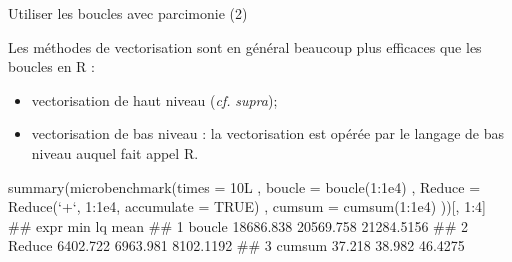 \documentclass[12pt,handout,ignorenonframetext,]{beamer}
\newenvironment{Shaded}{}{}
\newcommand{\KeywordTok}[1]{\textcolor[rgb]{0.00,0.00,1.00}{#1}}
\newcommand{\DataTypeTok}[1]{#1}
\newcommand{\DecValTok}[1]{#1}
\newcommand{\FloatTok}[1]{#1}
\newcommand{\StringTok}[1]{\textcolor[rgb]{0.00,0.50,0.50}{#1}}
\newcommand{\OtherTok}[1]{\textcolor[rgb]{1.00,0.25,0.00}{#1}}
\newcommand{\OperatorTok}[1]{#1}
\newcommand{\NormalTok}[1]{#1}
\providecommand{\tightlist}{%
  \setlength{\itemsep}{0pt}\setlength{\parskip}{0pt}}
\renewenvironment{Shaded}{\begin{snugshade}}{\end{snugshade}}
\begin{document}
\begin{frame}[fragile]{Utiliser les boucles avec parcimonie (2)}

\small
Les méthodes de vectorisation sont en général beaucoup plus efficaces
que les boucles en R :

\begin{itemize}
\tightlist
\item
  vectorisation de haut niveau (\emph{cf.} \emph{supra});
\item
  vectorisation de bas niveau : la vectorisation est opérée par le
  langage de bas niveau auquel fait appel R.
\end{itemize}

\pause \footnotesize

\begin{Shaded}
\begin{Highlighting}[]
\KeywordTok{summary}\NormalTok{(}\KeywordTok{microbenchmark}\NormalTok{(}\DataTypeTok{times =}\NormalTok{ 10L}
\NormalTok{  , }\DataTypeTok{boucle =} \KeywordTok{boucle}\NormalTok{(}\DecValTok{1}\OperatorTok{:}\FloatTok{1e4}\NormalTok{)}
\NormalTok{  , }\DataTypeTok{Reduce =} \KeywordTok{Reduce}\NormalTok{(}\StringTok{`}\DataTypeTok{+}\StringTok{`}\NormalTok{, }\DecValTok{1}\OperatorTok{:}\FloatTok{1e4}\NormalTok{, }\DataTypeTok{accumulate =} \OtherTok{TRUE}\NormalTok{)}
\NormalTok{  , }\DataTypeTok{cumsum =} \KeywordTok{cumsum}\NormalTok{(}\DecValTok{1}\OperatorTok{:}\FloatTok{1e4}\NormalTok{)}
\NormalTok{))[, }\DecValTok{1}\OperatorTok{:}\DecValTok{4}\NormalTok{]}
\NormalTok{  ##     expr       min        lq       mean}
\NormalTok{  ## 1 boucle 18686.838 20569.758 21284.5156}
\NormalTok{  ## 2 Reduce  6402.722  6963.981  8102.1192}
\NormalTok{  ## 3 cumsum    37.218    38.982    46.4275}
\end{Highlighting}
\end{Shaded}

\end{frame}
\end{document}
